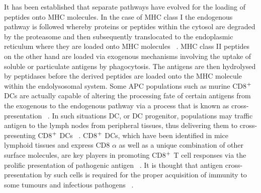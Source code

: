 It has been established that separate pathways have evolved for the loading of peptides onto MHC molecules. In the case of MHC class I the endogenous pathway is followed whereby proteins or peptides within the cytosol are degraded by the proteasome and then subsequently translocated to the endoplasmic reticulum where they are loaded onto MHC molecules ~\autocite{Cha2007}. MHC class II peptides on the other hand are loaded via exogenous mechanisms involving the uptake of soluble or particulate antigens by phagocytosis. The antigens are then hydrolysed by peptidases before the derived peptides are loaded onto the MHC molecule within the endolysosomal system. Some APC populations such as murine CD8$\textsuperscript{+}$ DCs are actually capable of altering the processing fate of certain antigens from the exogenous to the endogenous pathway via a process that is known as cross-presentation ~\autocite{Cha2007}. In such situations DC, or DC progenitor, populations may traffic antigen to the lymph nodes from peripheral tissues, thus delivering them to cross-presenting CD8$\textsuperscript{+}$ DCs ~\autocite{Igy2013}. CD8$\textsuperscript{+}$ DCs, which have been identified in mice lymphoid tissues and express CD8 $\alpha$ as well as a unique combination of other surface molecules, are key players in promoting CD8$\textsuperscript{+}$ T cell responses via the prolific presentation of pathogenic antigen ~\autocite{Sho2010}. It is thought that antigen cross-presentation by such cells is required for the proper acquisition of immunity to some tumours and infectious pathogens ~\autocite{Cha2007}.

